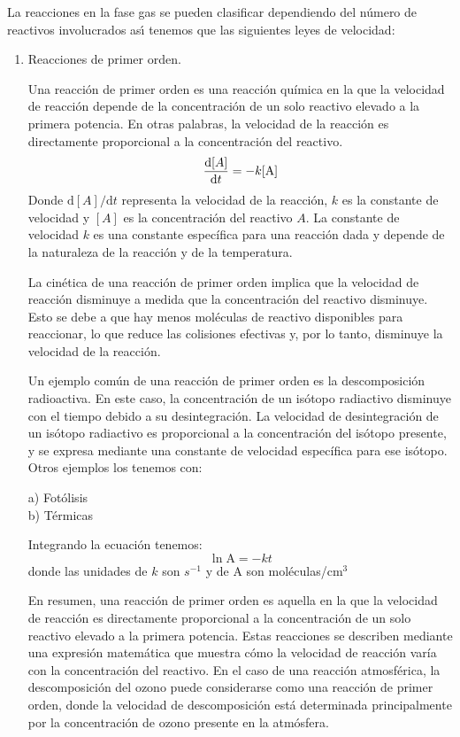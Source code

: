 La reacciones en la fase gas se pueden clasificar dependiendo del n\'umero de reactivos involucrados as\'{\i} tenemos que las siguientes leyes de velocidad:
\begin{enumerate}
\item Reacciones de primer orden.

Una reacción de primer orden es una reacción química en la que la velocidad de reacción depende de la concentración de un solo reactivo elevado a la primera potencia. En otras palabras, la velocidad de la reacción es directamente proporcional a la concentración del reactivo.
	 \begin{equation*}
	\frac{\mathrm{d}\textrm[A]}{\mathrm{d}t}=-k[\textrm{A}]
	\end{equation*}
Donde $\mathrm{d}[A]/\mathrm{d}t$ representa la velocidad de la reacción, $k$ es la constante de velocidad y $[A]$ es la concentración del reactivo $A$. La constante de velocidad $k$ es una constante específica para una reacción dada y depende de la naturaleza de la reacción y de la temperatura.

La cinética de una reacción de primer orden implica que la velocidad de reacción disminuye a medida que la concentración del reactivo disminuye. Esto se debe a que hay menos moléculas de reactivo disponibles para reaccionar, lo que reduce las colisiones efectivas y, por lo tanto, disminuye la velocidad de la reacción.

Un ejemplo común de una reacción de primer orden es la descomposición radioactiva. En este caso, la concentración de un isótopo radiactivo disminuye con el tiempo debido a su desintegración. La velocidad de desintegración de un isótopo radiactivo es proporcional a la concentración del isótopo presente, y se expresa mediante una constante de velocidad específica para ese isótopo. Otros ejemplos los tenemos con:
	\begin{description}
		\item[a) Fot\'olisis]  
		\item[b) T\'ermicas] 
	\end{description}
Integrando la ecuaci\'on tenemos:
	\begin{equation*}
	\ln \textrm{A} = -kt
	\end{equation*}
	donde las unidades de $k$ son $s^{-1}$ y de A  son moléculas/cm$^3$
	
En resumen, una reacción de primer orden es aquella en la que la velocidad de reacción es directamente proporcional a la concentración de un solo reactivo elevado a la primera potencia. Estas reacciones se describen mediante una expresión matemática que muestra cómo la velocidad de reacción varía con la concentración del reactivo. En el caso de una reacción atmosférica, la descomposición del ozono puede considerarse como una reacción de primer orden, donde la velocidad de descomposición está determinada principalmente por la concentración de ozono presente en la atmósfera.


\end{enumerate}
